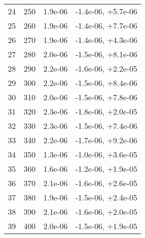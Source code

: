 \begin{table}
\begin{adjustbox}{width=1\textwidth/2}
\begin{tabular}{|c|c|c|c|}
\cline{1-4}
24 & 250 & 1.9e-06 & -1.4e-06, +5.7e-06 \\
\cline{1-4}
25 & 260 & 1.9e-06 & -1.4e-06, +7.7e-06 \\
\cline{1-4}
26 & 270 & 1.9e-06 & -1.4e-06, +4.3e-06 \\
\cline{1-4}
27 & 280 & 2.0e-06 & -1.5e-06, +8.1e-06 \\
\cline{1-4}
28 & 290 & 2.2e-06 & -1.6e-06, +2.2e-05 \\
\cline{1-4}
29 & 300 & 2.2e-06 & -1.5e-06, +8.4e-06 \\
\cline{1-4}
30 & 310 & 2.0e-06 & -1.5e-06, +7.8e-06 \\
\cline{1-4}
31 & 320 & 2.3e-06 & -1.8e-06, +2.0e-05 \\
\cline{1-4}
32 & 330 & 2.3e-06 & -1.5e-06, +7.4e-06 \\
\cline{1-4}
33 & 340 & 2.2e-06 & -1.7e-06, +9.2e-06 \\
\cline{1-4}
34 & 350 & 1.3e-06 & -1.0e-06, +3.6e-05 \\
\cline{1-4}
35 & 360 & 1.6e-06 & -1.2e-06, +1.9e-05 \\
\cline{1-4}
36 & 370 & 2.1e-06 & -1.6e-06, +2.6e-05 \\
\cline{1-4}
37 & 380 & 1.9e-06 & -1.5e-06, +2.4e-05 \\
\cline{1-4}
38 & 390 & 2.1e-06 & -1.6e-06, +2.0e-05 \\
\cline{1-4}
39 & 400 & 2.0e-06 & -1.5e-06, +1.9e-05 \\
\cline{1-4}
\end{tabular}
\end{adjustbox}
\end{table}

